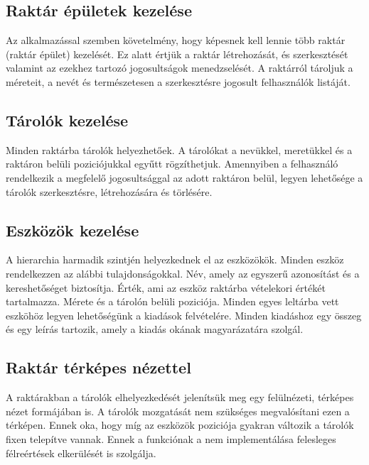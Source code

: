 \subsection{Raktár épületek kezelése}
Az alkalmazással szemben követelmény, hogy képesnek kell lennie több raktár (raktár épület) kezelését.
Ez alatt értjük a raktár létrehozását, és szerkesztését valamint az ezekhez tartozó jogosultságok menedzselését.
A raktárról tároljuk a méreteit, a nevét és természetesen a szerkesztésre jogosult felhasználók listáját.

\subsection{Tárolók kezelése}
Minden raktárba tárolók helyezhetőek. A tárolókat a nevükkel, meretükkel és a raktáron belüli poziciójukkal egyűtt rögzíthetjuk.
Amennyiben a felhasználó rendelkezik a megfelelő jogosultsággal az adott raktáron belül, legyen lehetősége a tárolók szerkesztésre, létrehozására és törlésére.

\subsection{Eszközök kezelése}
A hierarchia harmadik szintjén helyezkednek el az eszközökök. 
Minden eszköz rendelkezzen az alábbi tulajdonságokkal.
Név, amely az egyszerű azonosítást és a kereshetőséget biztosítja.
Érték, ami az eszköz raktárba vételekori értékét tartalmazza.
Mérete és a tárolón belüli poziciója. 
Minden egyes leltárba vett eszköhöz legyen lehetőségünk a kiadások felvételére.
Minden kiadáshoz egy összeg és egy leírás tartozik, amely a kiadás okának magyarázatára szolgál.

\subsection{Raktár térképes nézettel}
A raktárakban a tárolók elhelyezkedését jelenítsük meg egy felülnézeti, térképes nézet formájában is.
A tárolók mozgatását nem szükséges megvalósítani ezen a térképen.
Ennek oka, hogy míg az eszközök poziciója gyakran változik a tárolók fixen telepítve vannak.
Ennek a funkciónak a nem implementálása felesleges félreértések elkerülését is szolgálja.

